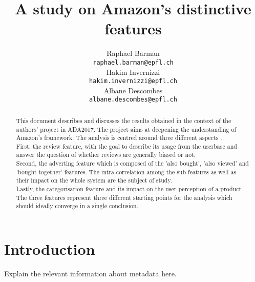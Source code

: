 \documentclass[11pt]{article}
\title{A study on Amazon's distinctive features}
\author{Raphael Barman \\
  {\tt raphael.barman@epfl.ch} \\\And
  Hakim Invernizzi \\
  {\tt hakim.invernizzi@epfl.ch} \\\And
Albane Descombes \\
{\tt albane.descombes@epfl.ch} \\}
\date{}
\begin{document}
\maketitle
\begin{abstract}
  This document describes and discusses the results obtained in the context of the authors' project in ADA2017. The project aims at deepening the understanding 
  of Amazon's framework. The analysis is centred around three different aspects . \\ First, the review feature, with the goal to describe its usage from the userbase and answer the question of whether reviews are generally biased or not. \\ Second, the adverting feature which is composed of the 'also bought', 'also viewed' and 'bought together' features. The intra-correlation among the sub-features as well as their impact on the whole system are the subject of study. \\ Lastly, the categorisation feature and its impact on the user perception of a product. \\  The three features represent three different starting points for the analysis which should ideally converge in a single conclusion.
\end{abstract}


\section{Introduction}
  Explain the relevant information about metadata here.
  
\end{document}
